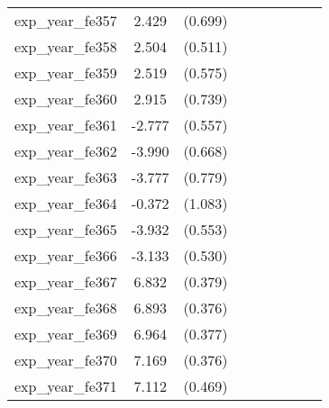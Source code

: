 {\begin{tabular}{l*{4}{cc}}
exp\_year\_fe357&    2.429\sym{***}&  (0.699)&                  &         &                  &         &                  &         \\
exp\_year\_fe358&    2.504\sym{***}&  (0.511)&                  &         &                  &         &                  &         \\
exp\_year\_fe359&    2.519\sym{***}&  (0.575)&                  &         &                  &         &                  &         \\
exp\_year\_fe360&    2.915\sym{***}&  (0.739)&                  &         &                  &         &                  &         \\
exp\_year\_fe361&   -2.777\sym{***}&  (0.557)&                  &         &                  &         &                  &         \\
exp\_year\_fe362&   -3.990\sym{***}&  (0.668)&                  &         &                  &         &                  &         \\
exp\_year\_fe363&   -3.777\sym{***}&  (0.779)&                  &         &                  &         &                  &         \\
exp\_year\_fe364&   -0.372         &  (1.083)&                  &         &                  &         &                  &         \\
exp\_year\_fe365&   -3.932\sym{***}&  (0.553)&                  &         &                  &         &                  &         \\
exp\_year\_fe366&   -3.133\sym{***}&  (0.530)&                  &         &                  &         &                  &         \\
exp\_year\_fe367&    6.832\sym{***}&  (0.379)&                  &         &                  &         &                  &         \\
exp\_year\_fe368&    6.893\sym{***}&  (0.376)&                  &         &                  &         &                  &         \\
exp\_year\_fe369&    6.964\sym{***}&  (0.377)&                  &         &                  &         &                  &         \\
exp\_year\_fe370&    7.169\sym{***}&  (0.376)&                  &         &                  &         &                  &         \\
exp\_year\_fe371&    7.112\sym{***}&  (0.469)&                  &         &                  &         &                  &         \\

\end{tabular}}
